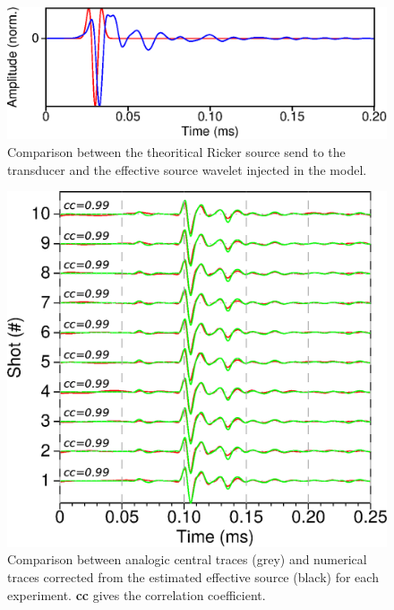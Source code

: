 \documentclass[manuscript,revised]{geophysics}
\begin{document}
\begin{figure}[!h]
	\centering
	\includegraphics[scale=0.5]{fig/srccomp.eps}
	\caption{Comparison between the theoritical Ricker source send to the transducer and the effective source wavelet injected in the model.}
	\label{srccomp}
\end{figure}

\begin{figure}[!h]
	\centering
	\includegraphics[scale=0.5]{fig/spec_F50_CT_COMP.eps}
	\caption{Comparison between analogic central traces (grey) and numerical traces corrected from the estimated effective source (black) for each experiment. \textbf{cc} gives the correlation coefficient.}
	\label{panel_srcest_2d_mean_comp}
\end{figure}

\end{document}
